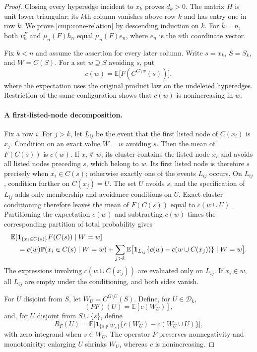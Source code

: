 \documentclass[11pt]{article}
\theoremstyle{definition}
\theoremstyle{remark}
\numberwithin{equation}{section}
\begin{document}
\begin{proof}
Closing every hyperedge incident to $x_k$ proves $d_k>0$. The matrix $H$
is unit lower triangular: its $k$th column vanishes above row $k$ and has
entry one in row $k$. We prove \eqref{cmp:cone-relation} by descending
induction on $k$. For $k=n$, both $v_n^F$ and $\mu_n(F)h_n$ equal
$\mu_n(F)e_n$, where $e_n$ is the $n$th coordinate vector.

Fix $k<n$ and assume the assertion for every later column. Write
$s=x_k$, $S=S_k$, and $W=C(S)$. For a set $w\supseteq S$ avoiding $s$, put
\[
 c(w)=\mathbb E\bigl[F(C^{G\setminus w}(s))\bigr],
\]
where the expectation uses the original product law on the undeleted
hyperedges. Restriction of the same configuration shows that $c(w)$ is
nonincreasing in $w$.

\paragraph{A first-listed-node decomposition.}
Fix a row $i$. For $j>k$, let $L_{ij}$ be the event that the first listed
node of $C(x_i)$ is $x_j$.
Condition on an exact value $W=w$ avoiding $s$. Then the mean of $F(C(s))$
is $c(w)$. If $x_i\notin w$, its cluster contains the listed node $x_i$
and avoids all listed nodes preceding $s$, which belong to $w$.
Its first listed node is therefore $s$ precisely when $x_i\in C(s)$;
otherwise exactly one of the events $L_{ij}$ occurs.
On $L_{ij}$, condition further on $C(x_j)=U$. The set $U$ avoids $s$, and
the specification of $L_{ij}$ adds only membership and avoidance conditions
on $U$. Exact-cluster conditioning therefore leaves the mean of $F(C(s))$
equal to $c(w\cup U)$. Partitioning the expectation $c(w)$ and subtracting
$c(w)$ times the corresponding partition of total probability gives
\begin{align}
 &\mathbb E[\mathbf 1_{\{x_i\in C(s)\}}F(C(s))\mid W=w]
 \notag\\
 &\quad=c(w)\mathbb P(x_i\in C(s)\mid W=w)
   +\sum_{j>k}\mathbb E\bigl[
       \mathbf 1_{L_{ij}}\{c(w)-c(w\cup C(x_j))\}\mid W=w\bigr].
 \label{cmp:partition}
\end{align}
The expressions involving $c(w\cup C(x_j))$ are evaluated only on
$L_{ij}$. If $x_i\in w$, all $L_{ij}$ are empty under the conditioning,
and both sides vanish.

For $U$ disjoint from $S$, let
$W_U=C^{G\setminus U}(S)$. Define, for $U\in\mathcal D_k$,
\[
 (PF)(U)=\mathbb E[c(W_U)],
\]
and, for $U$ disjoint from $S\cup\{s\}$, define
\begin{equation}\label{cmp:residual}
 R_F(U)=\mathbb E\bigl[
   \mathbf 1_{\{s\notin W_U\}}
   \{c(W_U)-c(W_U\cup U)\}\bigr],
\end{equation}
with zero integrand when $s\in W_U$. The operator $P$ preserves
nonnegativity and monotonicity: enlarging $U$ shrinks $W_U$, whereas $c$
is nonincreasing.


\end{proof}
\end{document}
